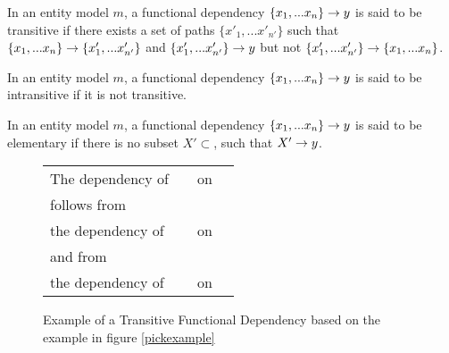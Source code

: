 \documentclass[10pt,a4paper]{article}
\newcommand{\genericmodel}{\mathcal{M}}
\renewcommand{\genericmodel}{{m}}
\begin{document}
\begin{definition} %
In an entity model $\genericmodel$, a functional dependency $\{x_1,...x_n\} \rightarrow y$
is said to be transitive if there exists a set of paths $\{x'_1,...x'_{n'}\}$ such that
$\{x_1,...x_n\} \rightarrow \{x'_1,...x'_{n'}\}$ and $\{x'_1,...x'_{n'}\} \rightarrow y$ but not
$\{x'_1,...x'_{n'}\} \rightarrow \{x_1,...x_n\}$.
\end{definition}
\begin{definition} %
In an entity model $\genericmodel$, a functional dependency $\{x_1,...x_n\} \rightarrow y$
is said to be intransitive if it is not transitive.
\end{definition}
\begin{definition} %
In an entity model $\genericmodel$, a functional dependency $\{x_1,...x_n\} \rightarrow y$
is said to be elementary if there is no  subset $X' \subset$, such that $X' \rightarrow y$.
\end{definition}
\begin{figure}[H]
\begin{tabular}{p{3.0cm} c p{1cm} c}
The dependency of & 
                    & on &  \\[0.5cm]
										follows from \\[0.5cm]
the dependency of &  & on    &
        \\[0.5cm]
and from \\[0.5cm]
the dependency of & 

& on&
 
\end{tabular}
\caption{Example of a Transitive Functional Dependency based on the example in figure \ref{pickexample}}
\end{figure}
\end{document}
